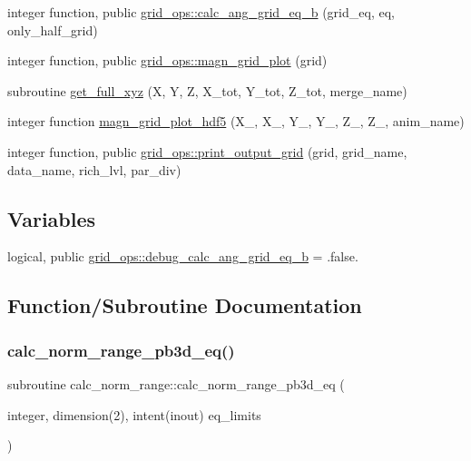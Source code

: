 \begin{DoxyCompactItemize}
\item 
integer function, public \hyperlink{namespacegrid__ops_a06107dbdfd1dd62e372cc29ab0255bad}{grid\+\_\+ops\+::calc\+\_\+ang\+\_\+grid\+\_\+eq\+\_\+b} (grid\+\_\+eq, eq, only\+\_\+half\+\_\+grid)
\item 
integer function, public \hyperlink{namespacegrid__ops_addd76b7b3be0b51e0863ae0cdfef41e6}{grid\+\_\+ops\+::magn\+\_\+grid\+\_\+plot} (grid)
\item 
subroutine \hyperlink{grid__ops_8f90_ab54f19ae54d39ec48cd2602f7ed0e73b}{get\+\_\+full\+\_\+xyz} (X, Y, Z, X\+\_\+tot, Y\+\_\+tot, Z\+\_\+tot, merge\+\_\+name)
\item 
integer function \hyperlink{grid__ops_8f90_a7bfbb51880742066ae3add67ee03df2d}{magn\+\_\+grid\+\_\+plot\+\_\+hdf5} (X\+\_, X\+\_, Y\+\_, Y\+\_, Z\+\_, Z\+\_, anim\+\_\+name)
\item 
integer function, public \hyperlink{namespacegrid__ops_ab2a8efa54d36500efcabeb9f1aabbcc6}{grid\+\_\+ops\+::print\+\_\+output\+\_\+grid} (grid, grid\+\_\+name, data\+\_\+name, rich\+\_\+lvl, par\+\_\+div)
\end{DoxyCompactItemize}
\subsection*{Variables}
\begin{DoxyCompactItemize}
\item 
logical, public \hyperlink{namespacegrid__ops_ad043ab1b07b2d251bb7596b8c8d2f960}{grid\+\_\+ops\+::debug\+\_\+calc\+\_\+ang\+\_\+grid\+\_\+eq\+\_\+b} = .false.
\end{DoxyCompactItemize}


\subsection{Function/\+Subroutine Documentation}
\mbox{\label{grid__ops_8f90_a868669b6df6c0fa6a8cedd993042f6ea}} 
\subsubsection{\texorpdfstring{calc\+\_\+norm\+\_\+range\+\_\+pb3d\+\_\+eq()}{calc\_norm\_range\_pb3d\_eq()}}
{\footnotesize\ttfamily subroutine calc\+\_\+norm\+\_\+range\+::calc\+\_\+norm\+\_\+range\+\_\+pb3d\+\_\+eq (\begin{DoxyParamCaption}\item[{integer, dimension(2), intent(inout)}]{eq\+\_\+limits }\end{DoxyParamCaption})}



